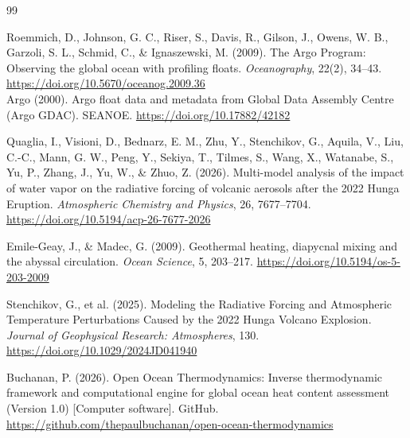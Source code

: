 \documentclass[11pt,a4paper]{article}
\begin{document}
\begin{thebibliography}{99}

Roemmich, D., Johnson, G. C., Riser, S., Davis, R., Gilson, J., Owens, W. B., Garzoli, S. L., Schmid, C., \& Ignaszewski, M. (2009). The Argo Program: Observing the global ocean with profiling floats. \textit{Oceanography}, 22(2), 34--43. \url{https://doi.org/10.5670/oceanog.2009.36}\\
Argo (2000). Argo float data and metadata from Global Data Assembly Centre (Argo GDAC). SEANOE. \url{https://doi.org/10.17882/42182}

Quaglia, I., Visioni, D., Bednarz, E. M., Zhu, Y., Stenchikov, G., Aquila, V., Liu, C.-C., Mann, G. W., Peng, Y., Sekiya, T., Tilmes, S., Wang, X., Watanabe, S., Yu, P., Zhang, J., Yu, W., \& Zhuo, Z. (2026). Multi-model analysis of the impact of water vapor on the radiative forcing of volcanic aerosols after the 2022 Hunga Eruption. \textit{Atmospheric Chemistry and Physics}, 26, 7677--7704. \url{https://doi.org/10.5194/acp-26-7677-2026}

Emile-Geay, J., \& Madec, G. (2009). Geothermal heating, diapycnal mixing and the abyssal circulation. \textit{Ocean Science}, 5, 203--217. \url{https://doi.org/10.5194/os-5-203-2009}

Stenchikov, G., et al. (2025). Modeling the Radiative Forcing and Atmospheric Temperature Perturbations Caused by the 2022 Hunga Volcano Explosion. \textit{Journal of Geophysical Research: Atmospheres}, 130. \url{https://doi.org/10.1029/2024JD041940}

Buchanan, P. (2026). Open Ocean Thermodynamics: Inverse thermodynamic framework and computational engine for global ocean heat content assessment (Version 1.0) [Computer software]. GitHub. \url{https://github.com/thepaulbuchanan/open-ocean-thermodynamics}

\end{thebibliography}
\end{document}
